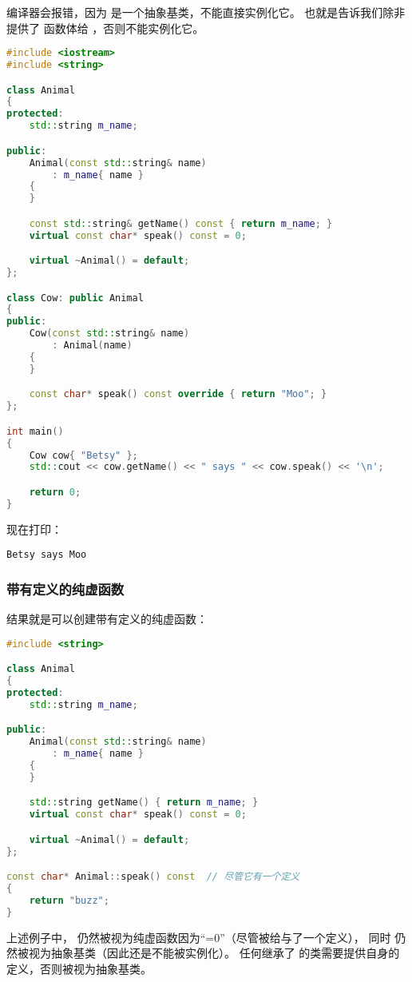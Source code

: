 \documentclass[../../LearnCpp.tex]{subfiles}
\begin{document}
编译器会报错，因为  是一个抽象基类，不能直接实例化它。
也就是告诉我们除非提供了  函数体给 ，否则不能实例化它。

\begin{lstlisting}[language=C++]
#include <iostream>
#include <string>

class Animal
{
protected:
    std::string m_name;

public:
    Animal(const std::string& name)
        : m_name{ name }
    {
    }

    const std::string& getName() const { return m_name; }
    virtual const char* speak() const = 0;

    virtual ~Animal() = default;
};

class Cow: public Animal
{
public:
    Cow(const std::string& name)
        : Animal(name)
    {
    }

    const char* speak() const override { return "Moo"; }
};

int main()
{
    Cow cow{ "Betsy" };
    std::cout << cow.getName() << " says " << cow.speak() << '\n';

    return 0;
}
\end{lstlisting}

现在打印：

\begin{lstlisting}
Betsy says Moo
\end{lstlisting}

\subsubsection*{带有定义的纯虚函数}

结果就是可以创建带有定义的纯虚函数：

\begin{lstlisting}[language=C++]
#include <string>

class Animal
{
protected:
    std::string m_name;

public:
    Animal(const std::string& name)
        : m_name{ name }
    {
    }

    std::string getName() { return m_name; }
    virtual const char* speak() const = 0;

    virtual ~Animal() = default;
};

const char* Animal::speak() const  // 尽管它有一个定义
{
    return "buzz";
}
\end{lstlisting}

上述例子中， 仍然被视为纯虚函数因为“=0”（尽管被给与了一个定义），
同时  仍然被视为抽象基类（因此还是不能被实例化）。
任何继承了  的类需要提供自身的  定义，否则被视为抽象基类。
\end{document}
